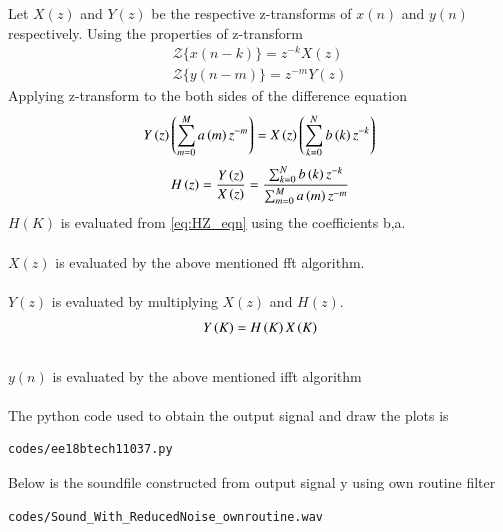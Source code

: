 \documentclass[journal,12pt,twocolumn]{IEEEtran}
\begin{document}
  Let $X(z)$ and $Y(z)$ be the respective z-transforms of $x(n)$ and $y(n)$ respectively.
  Using the properties of z-transform
  \begin{align}
      {\mathcal {Z}}\{x(n-k)\} = z^{-k}X(z) \\
      {\mathcal {Z}}\{y(n-m)\} = z^{-m}Y(z)
  \end{align}
\newline
Applying z-transform  to the both sides of the difference equation
\begin{align}
     Y\left(z\right) \left(\sum _{m=0}^{M}a\left(m\right) z^{-m}\right) = X\left(z\right) \left(\sum _{k=0}^{N}b\left(k\right)z^{-k}\right)
\end{align}
\begin{align}
\label{eq:HZ_eqn}
    H\left(z\right) = \frac{Y\left(z\right)}{X\left(z\right)} = \frac{\sum _{k=0}^{N}b\left(k\right) z^{-k}}{\sum _{m=0}^{M}a\left(m\right)z^{-m}}
\end{align}    
$H(K)$ is evaluated from \eqref{eq:HZ_eqn} using the coefficients b,a.
\\
\\
$X(z)$ is evaluated by the above mentioned fft algorithm.
\\
\\
$Y(z)$ is evaluated by multiplying $X(z)$ and $H(z)$.
\begin{align}
    Y\left(K\right) = H\left(K\right)X\left(K\right)
\end{align}
\\
$y(n)$ is evaluated by the above mentioned ifft algorithm
\\
\\
The python code used to obtain the output signal and draw the plots is
\begin{lstlisting}
codes/ee18btech11037.py
\end{lstlisting}
Below is the soundfile constructed from output signal y using own routine filter 
\begin{lstlisting}
codes/Sound_With_ReducedNoise_ownroutine.wav
\end{lstlisting}
\end{document}
